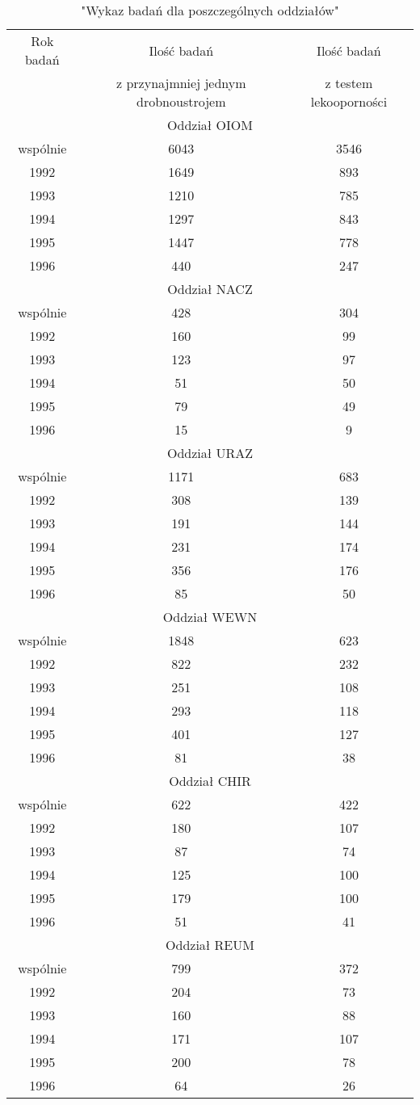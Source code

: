 \documentclass[a4paper,12pt]{article}
\begin{document}
\begin{table}[h]
\begin{center}
\caption{"Wykaz badań dla poszczególnych oddziałów"}
\begin{tabular}{c|c|c}
\hline
Rok badań & Ilość badań & Ilość badań \\
& z przynajmniej jednym drobnoustrojem &z testem lekooporności \\
\hline \multicolumn{3}{|c|}{Oddział OIOM} \\ \hline
wspólnie &6043 &3546 \\
1992 &1649 &893 \\
1993 &1210 &785 \\
1994 &1297 &843 \\
1995 &1447 &778 \\
1996 &440 &247 \\
\hline \multicolumn{3}{|c|}{Oddział NACZ} \\ \hline
wspólnie &428 &304 \\
1992 &160 &99 \\
1993 &123 &97 \\
1994 &51 &50 \\
1995 &79 &49 \\
1996 &15 &9 \\
\hline \multicolumn{3}{|c|}{Oddział URAZ} \\ \hline
wspólnie &1171 &683 \\
1992 &308 &139 \\
1993 &191 &144 \\
1994 &231 &174 \\
1995 &356 &176 \\
1996 &85 &50 \\
\hline \multicolumn{3}{|c|}{Oddział WEWN} \\ \hline
wspólnie &1848 &623 \\
1992 &822 &232 \\
1993 &251 &108 \\
1994 &293 &118 \\
1995 &401 &127 \\
1996 &81 &38 \\
\hline \multicolumn{3}{|c|}{Oddział CHIR} \\ \hline
wspólnie &622 &422 \\
1992 &180 &107 \\
1993 &87 &74 \\
1994 &125 &100 \\
1995 &179 &100 \\
1996 &51 &41 \\
\hline \multicolumn{3}{|c|}{Oddział REUM} \\ \hline
wspólnie &799 &372 \\
1992 &204 &73 \\
1993 &160 &88 \\
1994 &171 &107 \\
1995 &200 &78 \\
1996 &64 &26 \\

\hline
\end{tabular}
\end{center}
\end{table}
\end{document}
